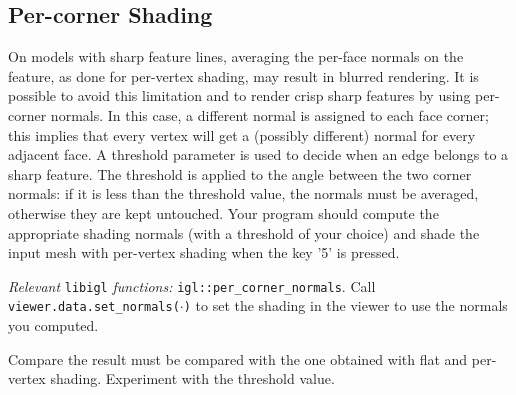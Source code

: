 \documentclass[11pt]{amsart}
\begin{document}
\subsection{Per-corner Shading}
On models with sharp feature lines, averaging the per-face normals on the feature, as done for per-vertex shading, may result in blurred rendering. It is possible to avoid this limitation and to render crisp sharp features by using per-corner normals. In this case, a different normal is assigned to each face corner; this implies that every vertex will get a (possibly different) normal for every adjacent face. A threshold parameter is used to decide when an edge belongs to a sharp feature. The threshold is applied to the angle between the two corner normals: if it is less than the threshold value, the normals must be averaged, otherwise they are kept untouched.  Your program should compute the appropriate shading normals (with a threshold of your choice) and shade the input mesh with per-vertex shading when the key '5' is pressed.

\emph{Relevant} \texttt{libigl} \emph{functions: }
\texttt{igl::per\_corner\_normals}. Call
\texttt{viewer.data.set\_normals($\cdot$)} to set the shading in the viewer to
use the normals you computed.

Compare the result must be compared with the one obtained with flat and per-vertex shading. Experiment with the threshold value.
\end{document}
